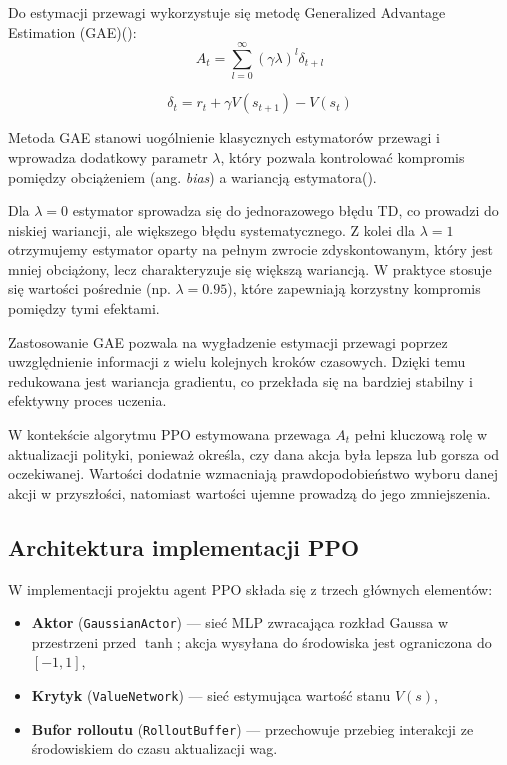 \documentclass[12pt,twoside]{article}
\begin{document}
Do estymacji przewagi wykorzystuje się metodę Generalized Advantage Estimation (GAE)(\cite{str13}):
\[
A_t = \sum_{l=0}^{\infty} (\gamma \lambda)^l \delta_{t+l}
\]

\[
\delta_t = r_t + \gamma V(s_{t+1}) - V(s_t)
\]

Metoda GAE stanowi uogólnienie klasycznych estymatorów przewagi i wprowadza dodatkowy parametr $\lambda$, który pozwala kontrolować kompromis pomiędzy obciążeniem (ang. \textit{bias}) a wariancją estymatora(\cite{str13}).

Dla $\lambda = 0$ estymator sprowadza się do jednorazowego błędu TD, co prowadzi do niskiej wariancji, ale większego błędu systematycznego. Z kolei dla $\lambda = 1$ otrzymujemy estymator oparty na pełnym zwrocie zdyskontowanym, który jest mniej obciążony, lecz charakteryzuje się większą wariancją. W praktyce stosuje się wartości pośrednie (np. $\lambda = 0.95$), które zapewniają korzystny kompromis pomiędzy tymi efektami.

Zastosowanie GAE pozwala na wygładzenie estymacji przewagi poprzez uwzględnienie informacji z wielu kolejnych kroków czasowych. Dzięki temu redukowana jest wariancja gradientu, co przekłada się na bardziej stabilny i efektywny proces uczenia.

W kontekście algorytmu PPO estymowana przewaga $A_t$ pełni kluczową rolę w aktualizacji polityki, ponieważ określa, czy dana akcja była lepsza lub gorsza od oczekiwanej. Wartości dodatnie wzmacniają prawdopodobieństwo wyboru danej akcji w przyszłości, natomiast wartości ujemne prowadzą do jego zmniejszenia.

\subsection{Architektura implementacji PPO}

W implementacji projektu agent PPO składa się z trzech głównych elementów:
\begin{itemize}
    \item \textbf{Aktor} (\texttt{GaussianActor}) --- sieć MLP zwracająca rozkład Gaussa w przestrzeni przed $\tanh$; akcja wysyłana do środowiska jest ograniczona do $[-1, 1]$,
    \item \textbf{Krytyk} (\texttt{ValueNetwork}) --- sieć estymująca wartość stanu $V(s)$,
    \item \textbf{Bufor rolloutu} (\texttt{RolloutBuffer}) --- przechowuje przebieg interakcji ze środowiskiem do czasu aktualizacji wag.
\end{itemize}
\end{document}
